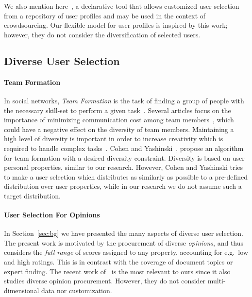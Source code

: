 We also mention here~\cite{amsterdamer2016december}, a declarative tool that allows customized user selection from a repository of user profiles and may be used in the context of crowdsourcing. Our flexible model for user profiles is inspired by this work; however, they do not consider the diversification of selected users.



\subsection{Diverse User Selection}
\label{sec:diverseUserPrelim} 

\paragraph*{Team Formation}
In social networks, \emph{Team Formation} is the task of finding a group of people with the necessary skill-set to perform a given task~\cite{lappas2009finding}. Several articles focus on the importance of minimizing communication cost among team members~\cite{lappas2009finding,kargar2012eff}, which could have a negative effect on the diversity of team members. Maintaining a high level of diversity is important in order to increase creativity which is required to handle complex tasks~\cite{buccafurri2014driving}. Cohen and Yashinski~\cite{cohen2017Crowdiv}, propose an algorithm for team formation with a desired diversity constraint. Diversity is based on user personal properties, similar to our research. However, Cohen and Yashinski tries to make a user selection which distributes as similarly as possible to a pre-defined distribution over user properties, while in our research we do not assume such a target distribution.

\paragraph*{User Selection For Opinions}
In Section~\ref{sec:bg} we have presented the many aspects of diverse user selection. The present work is motivated by the procurement of diverse \emph{opinions}, and thus considers the \emph{full range} of scores assigned to any property, accounting for e.g.\ low and high ratings. This is in contrast with the coverage of document topics or expert finding. The recent work of~\cite{wu2015hear} is the most relevant to ours since it also studies diverse opinion procurement. However, they do not consider multi-dimensional data nor customization. %